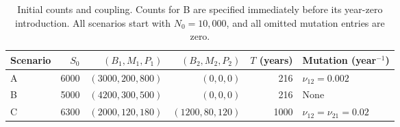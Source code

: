 \begin{table}[!htbp]\centering\small
\caption{Initial counts and coupling. Counts for B are specified immediately before its year-zero introduction. All scenarios start with $N_0=10{,}000$, and all omitted mutation entries are zero.}\label{tab:initials}
\begin{tabular}{lrrrrl}\toprule
Scenario & $S_0$ & $(B_1,M_1,P_1)$ & $(B_2,M_2,P_2)$ & $T$ (years) & Mutation (year$^{-1}$)\\\midrule
A & 6000 & $(3000,200,800)$ & $(0,0,0)$ & 216 & $\nu_{12}=0.002$\\
B & 5000 & $(4200,300,500)$ & $(0,0,0)$ & 216 & None\\
C & 6300 & $(2000,120,180)$ & $(1200,80,120)$ & 1000 & $\nu_{12}=\nu_{21}=0.02$\\
\bottomrule\end{tabular}\end{table}
